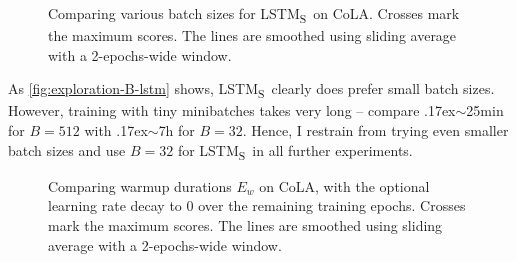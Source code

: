 \documentclass[bsc,frontabs,singlespacing,parskip,deptreport]{infthesis}
\def\mytilde{{\raise.17ex\hbox{$\scriptstyle\sim$}}}
\def\LSTMS{LSTM\textsubscript{S}}
\def\sliding{The lines are smoothed using sliding average with a 2-epochs-wide window.}
\begin{document}
{{{      \begin{figure}[h!t]
        \centering
        \caption{Comparing various batch sizes for \LSTMS~on CoLA. Crosses mark the maximum scores. \sliding}
        \label{fig:exploration-B-lstm}
      \end{figure}

      As \autoref{fig:exploration-B-lstm} shows, \LSTMS~clearly does prefer small batch sizes. However, training with tiny minibatches takes very long -- compare \mytilde25min for $B=512$ with \mytilde7h for $B=32$. Hence, I restrain from trying even smaller batch sizes and use $B=32$ for \LSTMS~in all further experiments.

      \begin{figure}[h!t]
        \centering
        \caption{Comparing warmup durations $E_w$ on CoLA, with the optional learning rate decay to 0 over the remaining training epochs. Crosses mark the maximum scores. \sliding}
        \label{fig:exploration-schedule}
      \end{figure}

}}}
\end{document}

